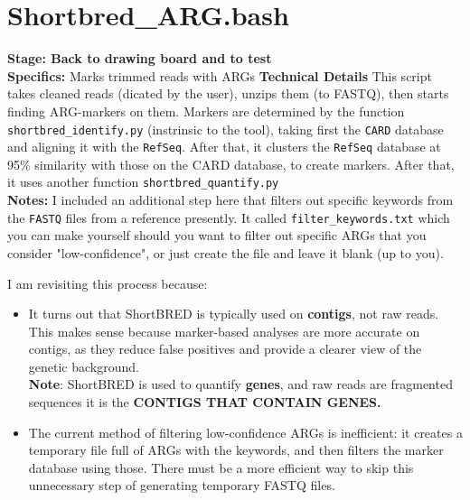 \documentclass[11pt]{report}
\begin{document}
{\section{Shortbred\_ARG.bash}
\textbf{Stage: Back to drawing board and to test} \\   
\textbf{Specifics:} Marks trimmed reads with ARGs 
\textbf{Technical Details} This script takes cleaned reads (dicated by the user), unzips them (to FASTQ), then starts finding ARG-markers on them. Markers are determined by the function \texttt{shortbred\_identify.py} (instrinsic to the tool), taking first the \texttt{CARD} database and aligning it with the \texttt{RefSeq}. After that, it clusters the \texttt{RefSeq} database at 95\% similarity with those on the CARD database, to create markers. After that, it uses another function \texttt{shortbred\_quantify.py}\\
\textbf{Notes:}  I included an additional step here that filters out specific keywords from the \texttt{FASTQ} files from a reference presently. It called \texttt{filter\_keywords.txt} which you can make yourself should you want to filter out specific ARGs that you consider "low-confidence", or just create the file and leave it blank (up to you). \\



\begin{tcolorbox}[title=Sept 20 2024 Update, coltitle=white]
	I am revisiting this process because:
	\begin{itemize}
		\item It turns out that ShortBRED is typically used on \textbf{contigs}, not raw reads. This makes sense because marker-based analyses are more accurate on contigs, as they reduce false positives and provide a clearer view of the genetic background. \\
		\textbf{Note}: ShortBRED is used to quantify \textbf{genes}, and raw reads are fragmented sequences it is the \textbf{CONTIGS THAT CONTAIN GENES.}
		
		\item The current method of filtering low-confidence ARGs is inefficient: it creates a temporary file full of ARGs with the keywords, and then filters the marker database using those. There must be a more efficient way to skip this unnecessary step of generating temporary FASTQ files. 
	\end{itemize}
	

\end{tcolorbox}}
\end{document}
